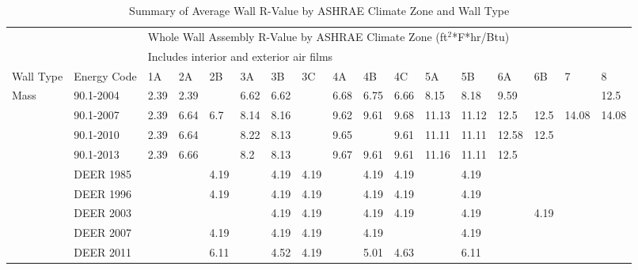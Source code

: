 \begin{table}
\scriptsize
\centering
\caption[Summary of Average Wall R-Value]{Summary of Average Wall R-Value by ASHRAE Climate Zone and Wall Type}
\label{tab:wall_r_value_averages}
\begin{tabular}{p{0.3in}p{0.5in}p{0.15in}p{0.15in}p{0.15in}p{0.15in}p{0.15in}p{0.15in}p{0.15in}p{0.15in}p{0.15in}p{0.15in}p{0.15in}p{0.15in}p{0.15in}p{0.15in}p{0.15in}}
\hline
\multicolumn{2}{l}{} & \multicolumn{15}{l}{Whole Wall Assembly R-Value by ASHRAE Climate Zone (ft$^2$*F*hr/Btu)} \\
\multicolumn{2}{l}{} & \multicolumn{15}{l}{Includes interior and exterior air films} \\ \hline
Wall Type & Energy Code & 1A & 2A &     2B &     3A &     3B &     3C &     4A &     4B &     4C &     5A &     5B &     6A &     6B &      7 &      8 \\
\hline
Mass & 90.1-2004 &   2.39 &   2.39 &        &   6.62 &   6.62 &        &   6.68 &   6.75 &   6.66 &   8.15 &   8.18 &   9.59 &        &        &   12.5 \\
           & 90.1-2007 &   2.39 &   6.64 &    6.7 &   8.14 &   8.16 &        &   9.62 &   9.61 &   9.68 &  11.13 &  11.12 &   12.5 &   12.5 &  14.08 &  14.08 \\
           & 90.1-2010 &   2.39 &   6.64 &        &   8.22 &   8.13 &        &   9.65 &        &   9.61 &  11.11 &  11.11 &  12.58 &   12.5 &        &        \\
           & 90.1-2013 &   2.39 &   6.66 &        &    8.2 &   8.13 &        &   9.67 &   9.61 &   9.61 &  11.16 &  11.11 &   12.5 &        &        &        \\
           & DEER 1985 &        &        &   4.19 &        &   4.19 &   4.19 &        &   4.19 &   4.19 &        &   4.19 &        &        &        &        \\
           & DEER 1996 &        &        &   4.19 &        &   4.19 &   4.19 &        &   4.19 &   4.19 &        &   4.19 &        &        &        &        \\
           & DEER 2003 &        &        &        &        &   4.19 &   4.19 &        &   4.19 &   4.19 &        &   4.19 &        &   4.19 &        &        \\
           & DEER 2007 &        &        &   4.19 &        &   4.19 &   4.19 &        &   4.19 &        &        &   4.19 &        &        &        &        \\
           & DEER 2011 &        &        &   6.11 &        &   4.52 &   4.19 &        &   5.01 &   4.63 &        &   6.11 &        &        &        &        \\

\end{tabular}
\end{table}
